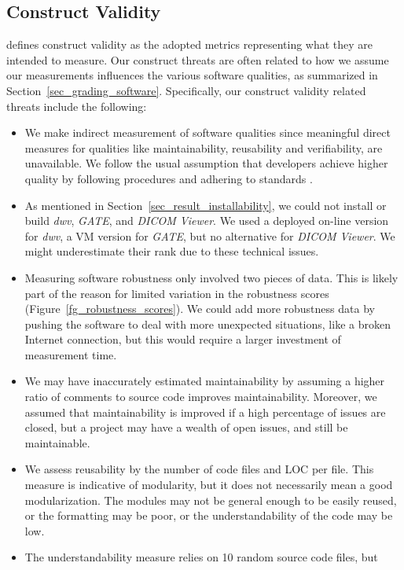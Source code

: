 \documentclass[final, 12pt, 3p, times]{elsarticle}
\begin{document}
\subsection{Construct Validity}

\cite{RunesonAndHost2009} defines construct validity as the adopted
metrics representing what they are intended to measure. Our construct threats are
often related to how we assume our measurements influences the various software
qualities, as summarized in Section~\ref{sec_grading_software}. Specifically,
our construct validity related threats include the following:

\begin{itemize}
\item We make indirect measurement of software qualities since meaningful direct
measures for qualities like maintainability, reusability and verifiability, are
unavailable.  We follow the usual assumption that developers achieve higher
quality by following procedures and adhering to standards \cite[p.\
112]{VanVliet2000}.
\item As mentioned in Section~\ref{sec_result_installability}, we could not
install or build \textit{dwv}, \textit{GATE}, and \textit{DICOM Viewer}. We used
a deployed on-line version for \textit{dwv}, a VM version for \textit{GATE}, but
no alternative for \textit{DICOM Viewer}. We might underestimate their rank due
to these technical issues.
\item Measuring software robustness only involved two pieces of data. This is
likely part of the reason for limited variation in the robustness scores
(Figure~\ref{fg_robustness_scores}). We could add more robustness data by
pushing the software to deal with more unexpected situations, like a broken
Internet connection, but this would require a larger investment of measurement
time. 
\item We may have inaccurately estimated maintainability by assuming a higher
ratio of comments to source code improves maintainability. Moreover, we assumed
that maintainability is improved if a high percentage of issues are closed, but
a project may have a wealth of open issues, and still be maintainable.
\item We assess reusability by the number of code files and LOC per file. This
measure is indicative of modularity, but it does not necessarily mean a good
modularization. The modules may not be general enough to be easily reused, or
the formatting may be poor, or the understandability of the code may be low.
\item The understandability measure relies on 10 random source code files, but

\end{itemize}
\end{document}
